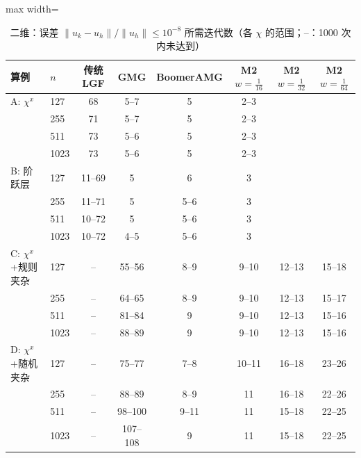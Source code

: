 \begin{table}[H]\centering\small
\caption{二维：误差 $\|u_k-u_h\|/\|u_h\|\le10^{-8}$ 所需迭代数（各 $\chi$ 的范围；--：1000 次内未达到）}\label{tab:k82d}
\begin{adjustbox}{max width=\textwidth}
\begin{tabular}{llcccccc}
\toprule
算例 & $n$ & 传统 LGF & GMG & BoomerAMG & M2 $w{=}\frac1{16}$ & M2 $w{=}\frac1{32}$ & M2 $w{=}\frac1{64}$ \\
\midrule
A: $\chi^x$ & 127 & 68 & 5--7 & 5 & 2--3 &  &  \\
 & 255 & 71 & 5--7 & 5 & 2--3 &  &  \\
 & 511 & 73 & 5--6 & 5 & 2--3 &  &  \\
 & 1023 & 73 & 5--6 & 5 & 2--3 &  &  \\
\midrule
B: 阶跃层 & 127 & 11--69 & 5 & 6 & 3 &  &  \\
 & 255 & 11--71 & 5 & 5--6 & 3 &  &  \\
 & 511 & 10--72 & 5 & 5--6 & 3 &  &  \\
 & 1023 & 10--72 & 4--5 & 5--6 & 3 &  &  \\
\midrule
C: $\chi^x$+规则夹杂 & 127 & -- & 55--56 & 8--9 & 9--10 & 12--13 & 15--18 \\
 & 255 & -- & 64--65 & 8--9 & 9--10 & 12--13 & 15--17 \\
 & 511 & -- & 81--84 & 9 & 9--10 & 12--13 & 15--16 \\
 & 1023 & -- & 88--89 & 9 & 9--10 & 12--13 & 15--16 \\
\midrule
D: $\chi^x$+随机夹杂 & 127 & -- & 75--77 & 7--8 & 10--11 & 16--18 & 23--26 \\
 & 255 & -- & 88--89 & 8--9 & 11 & 16--18 & 22--26 \\
 & 511 & -- & 98--100 & 9--11 & 11 & 15--18 & 22--25 \\
 & 1023 & -- & 107--108 & 9 & 11 & 15--18 & 22--25 \\
\bottomrule
\end{tabular}
\end{adjustbox}
\end{table}

